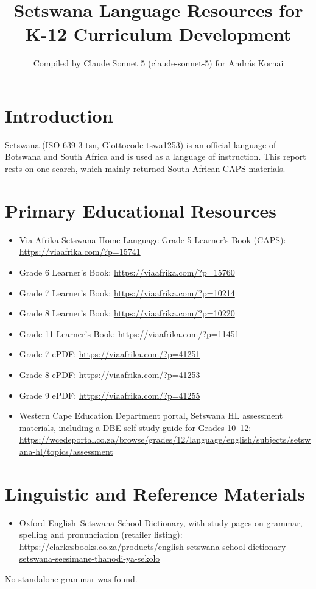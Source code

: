 \documentclass[12pt]{article}
\title{Setswana Language Resources for K-12 Curriculum Development}
\author{Compiled by Claude Sonnet 5 (claude-sonnet-5) for Andr\'as Kornai}
\date{}
\begin{document}
\maketitle

\section{Introduction}
Setswana (ISO 639-3 tsn, Glottocode tswa1253) is an official language of Botswana and South Africa and is used as a language of instruction. This report rests on one search, which mainly returned South African CAPS materials.

\section{Primary Educational Resources}
\begin{itemize}
\item Via Afrika Setswana Home Language Grade 5 Learner's Book (CAPS): \url{https://viaafrika.com/?p=15741}
\item Grade 6 Learner's Book: \url{https://viaafrika.com/?p=15760}
\item Grade 7 Learner's Book: \url{https://viaafrika.com/?p=10214}
\item Grade 8 Learner's Book: \url{https://viaafrika.com/?p=10220}
\item Grade 11 Learner's Book: \url{https://viaafrika.com/?p=11451}
\item Grade 7 ePDF: \url{https://viaafrika.com/?p=41251}
\item Grade 8 ePDF: \url{https://viaafrika.com/?p=41253}
\item Grade 9 ePDF: \url{https://viaafrika.com/?p=41255}
\item Western Cape Education Department portal, Setswana HL assessment materials, including a DBE self-study guide for Grades 10--12: \url{https://wcedeportal.co.za/browse/grades/12/language/english/subjects/setswana-hl/topics/assessment}
\end{itemize}

\section{Linguistic and Reference Materials}
\begin{itemize}
\item Oxford English--Setswana School Dictionary, with study pages on grammar, spelling and pronunciation (retailer listing): \url{https://clarkesbooks.co.za/products/english-setswana-school-dictionary-setswana-seesimane-thanodi-ya-sekolo}
\end{itemize}
No standalone grammar was found.
\end{document}
